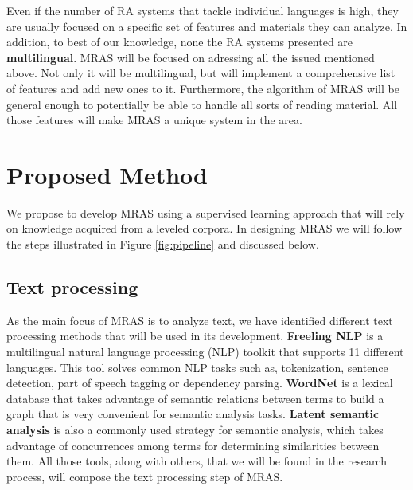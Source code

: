 \documentclass[12pt]{article}
\begin{document}
Even if the number of RA systems that tackle individual languages is high, they are usually focused on a specific set of features and materials they can analyze. In addition, to best of our knowledge, none the RA systems presented are \textbf{multilingual}. MRAS will be focused on adressing all the issued mentioned above. Not only it will be multilingual, but will implement a comprehensive list of features and add new ones to it. Furthermore, the algorithm of MRAS will be general enough to potentially be able to handle all sorts of reading material. All those features will make MRAS a unique system in the area.




\section{Proposed Method}

We propose to develop MRAS using a supervised learning approach that will rely on knowledge acquired from a leveled corpora. In designing MRAS we will follow the steps illustrated in Figure \ref{fig:pipeline} and discussed below.


\subsection{Text processing}
As the main focus of MRAS is to analyze text, we have identified different text processing methods that will be used in its development. \textbf{Freeling NLP} \cite{padro12,padro10b} is a multilingual natural language processing (NLP) toolkit that supports 11 different languages. This tool solves common NLP tasks such as, tokenization, sentence detection, part of speech tagging or dependency parsing. \textbf{WordNet} is a lexical database that takes advantage of semantic relations between terms to build a graph that is very convenient for semantic analysis tasks. \textbf{Latent semantic analysis} is also a commonly used strategy  for semantic analysis, which takes advantage of concurrences among terms for determining similarities between them. All those tools, along with others, that we will be found in the research process, will compose the text processing step of MRAS.
\end{document}
